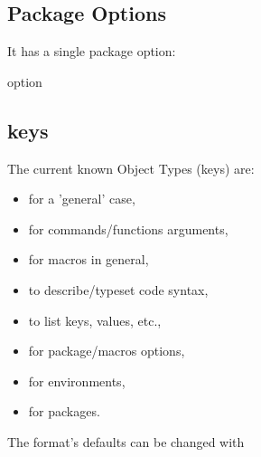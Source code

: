 \documentclass{article}
\begin{document}
\subsection{Package Options}
It has a single package option:
\begin{describelist}{option}
\end{describelist}

\subsection{ keys}\label{obj-type-def}


The current  known Object Types (keys)  are: 
\begin{itemize}[noitemsep]
\item {} for a 'general' case,
\item {} for commands/functions arguments,
\item {} for macros in general,
\item {} to describe/typeset code syntax,
\item {} to list keys, values, etc.,
\item {} for package/macros options,
\item {} for environments,
\item {} for packages.
\end{itemize}
The format's defaults can be changed with \tsobj{\setcodefmt}
\end{document}
